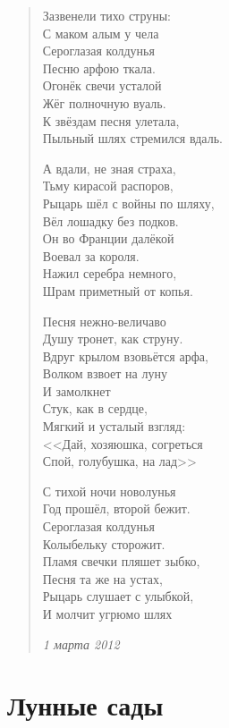 \documentclass[a4paper,12pt]{article}
\newcommand{\ldotst}{\so{...}\xspace}
\begin{document}
\begin{verse}
Зазвенели тихо струны:\\
С маком алым у чела\\
Сероглазая колдунья\\
Песню арфою ткала.\\
Огонёк свечи усталой\\
Жёг полночную вуаль.\\
К звёздам песня улетала,\\
Пыльный шлях стремился вдаль.

А вдали, не зная страха,\\
Тьму кирасой распоров,\\
Рыцарь шёл с войны по шляху,\\
Вёл лошадку без подков.\\
Он во Франции далёкой\\
Воевал за короля.\\
Нажил серебра немного,\\
Шрам приметный от копья.

Песня нежно-величаво\\
Душу тронет, как струну.\\
Вдруг крылом взовьётся арфа,\\
Волком взвоет на луну\\
И замолкнет\ldotst\\
Стук, как в сердце,\\
Мягкий и усталый взгляд:\\
<<Дай, хозяюшка, согреться\ldotst\\
Спой, голубушка, на лад\ldotst>>

С тихой ночи новолунья\\
Год прошёл, второй бежит.\\
Сероглазая колдунья\\
Колыбельку сторожит.\\
Пламя свечки пляшет зыбко,\\
Песня та же на устах,\\
Рыцарь слушает с улыбкой,\\
И молчит угрюмо шлях\ldotst

\emph{1 марта 2012}
\end{verse}
\newpage

\section{Лунные сады}
\end{document}

